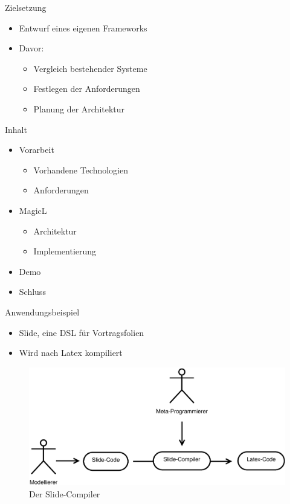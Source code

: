 \documentclass{beamer}
\begin{document}
\begin{frame}{Zielsetzung}
  \begin{itemize}
  \item Entwurf eines eigenen Frameworks
  \item Davor:
    \begin{itemize}
    \item Vergleich bestehender Systeme
    \item Festlegen der Anforderungen
    \item Planung der Architektur
    \end{itemize}
  \end{itemize}
\end{frame}

\begin{frame}{Inhalt}
  \begin{itemize}
  \item Vorarbeit
    \begin{itemize}
    \item Vorhandene Technologien
    \item Anforderungen
    \end{itemize}
  \item MagicL
    \begin{itemize}
    \item Architektur
    \item Implementierung
    \end{itemize}
  \item Demo
  \item Schluss
  \end{itemize}
\end{frame}

\begin{frame}{Anwendungsbeispiel}
  \begin{itemize}
  \item Slide, eine DSL für Vortragsfolien
  \item Wird nach Latex kompiliert
  \end{itemize}
  \begin{figure}
    \centering
    \includegraphics[scale=0.3]{images/flow_example_simple}
    \caption{Der Slide-Compiler}
  \end{figure}
\end{frame}
\end{document}

